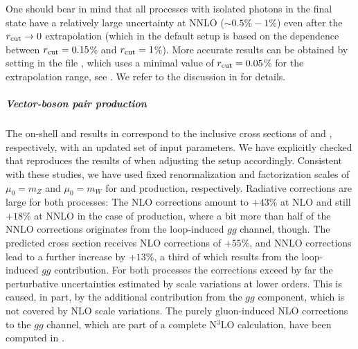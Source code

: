 \documentclass[english,11pt]{article}
\begin{document}
One should bear in mind that all processes with isolated photons in the final state have 
a relatively large uncertainty at NNLO ($\sim 0.5\%-1$\%) even after the $r_{\mathrm{cut}}\rightarrow 0$ extrapolation (which in the default setup is based on the \rcut{} dependence between $r_{\mathrm{cut}}=0.15$\% and $r_{\mathrm{cut}}=1$\%).
More accurate results can be obtained by setting  in the file , which uses a minimal value of $r_{\mathrm{cut}}=0.05$\% for the 
extrapolation range,
see .
We refer to the discussion in  for details.

\subparagraph{Vector-boson pair production}\quad

The on-shell \zz{} and \ww{} results in  correspond to the inclusive cross sections of  and , respectively, with an updated set of input parameters. We have explicitly checked 
 that \Matrix{} reproduces the results of  when adjusting the setup accordingly. Consistent with these studies, we have used fixed renormalization and factorization
scales of $\mu_0=m_Z$ and $\mu_0=m_W$ for \zz{} and \ww{} production, respectively. Radiative corrections are large for both processes: The NLO corrections amount to $+43$\% at NLO and still 
$+18$\% at NNLO in the case of \zz{} production, where a bit more than half of the NNLO corrections originates from the loop-induced $gg$ channel, though. The predicted \ww{} 
cross section receives NLO corrections of $+55$\%, and NNLO corrections lead to a further increase by $+13$\%, a third of which results from the loop-induced $gg$ contribution. 
For both processes the corrections exceed by far the perturbative uncertainties estimated by scale variations at lower orders. This is caused, in part, by the 
additional contribution from the $gg$ component, which is not covered by NLO scale variations.
The purely gluon-induced NLO corrections to the $gg$ channel, which are part of a complete N$^3$LO calculation, have been
computed in .
\end{document}
